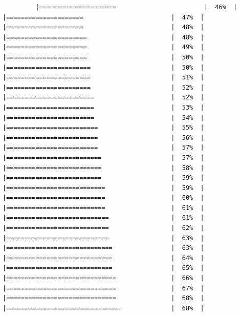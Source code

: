 \documentclass[
  krantz2]{krantz}
\begin{document}
\begin{verbatim}
         |=====================                        |  46%  |                                                     |=====================                        |  47%  |                                                     |=====================                        |  48%  |                                                     |======================                       |  48%  |                                                     |======================                       |  49%  |                                                     |======================                       |  50%  |                                                     |=======================                      |  50%  |                                                     |=======================                      |  51%  |                                                     |=======================                      |  52%  |                                                     |========================                     |  52%  |                                                     |========================                     |  53%  |                                                     |========================                     |  54%  |                                                     |=========================                    |  55%  |                                                     |=========================                    |  56%  |                                                     |=========================                    |  57%  |                                                     |==========================                   |  57%  |                                                     |==========================                   |  58%  |                                                     |==========================                   |  59%  |                                                     |===========================                  |  59%  |                                                     |===========================                  |  60%  |                                                     |===========================                  |  61%  |                                                     |============================                 |  61%  |                                                     |============================                 |  62%  |                                                     |============================                 |  63%  |                                                     |=============================                |  63%  |                                                     |=============================                |  64%  |                                                     |=============================                |  65%  |                                                     |==============================               |  66%  |                                                     |==============================               |  67%  |                                                     |==============================               |  68%  |                                                     |===============================              |  68%  |               
\end{verbatim}
\end{document}
